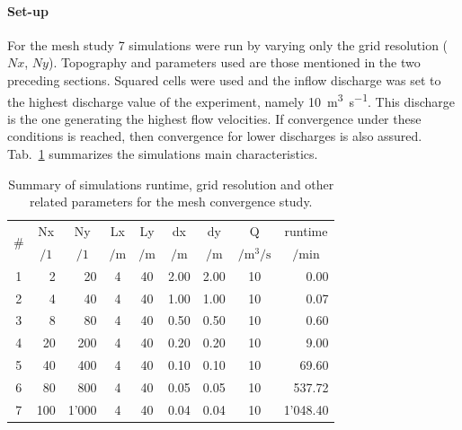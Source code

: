 \paragraph{Set-up} For the mesh study \num{7} simulations were run by varying only the grid resolution ($Nx$, $Ny$). 
Topography and parameters used are those mentioned in the two preceding sections.
Squared cells were used and the inflow discharge was set to the highest discharge value of the experiment, namely \SI{10}{\cubic\meter\per\second}.
This discharge is the one generating the highest flow velocities.
If convergence under these conditions is reached, then convergence for lower discharges is also assured.
Tab.~\ref{tab:mesh_study} summarizes the simulations main characteristics.

\begin{table}[h]
  \centering
  \caption{Summary of simulations runtime, grid resolution and other related parameters for the mesh convergence study.}
  \label{tab:mesh_study}
  \begin{tabular}{crrcccccr}
    \toprule
    \multirow{2}{*}{\#} & \multicolumn{1}{c}{Nx} & \multicolumn{1}{c}{Ny} & \multicolumn{1}{c}{Lx} & \multicolumn{1}{c}{Ly} & \multicolumn{1}{c}{dx} & \multicolumn{1}{c}{dy} & \multicolumn{1}{c}{Q} & \multicolumn{1}{c}{runtime} \\
       & \multicolumn{1}{c}{$/1$} & \multicolumn{1}{c}{$/1$} & \multicolumn{1}{c}{$/\si{\meter}$} & \multicolumn{1}{c}{$/\si{\m}$} & \multicolumn{1}{c}{$/\si{\m}$} & \multicolumn{1}{c}{$/\si{\m}$} & \multicolumn{1}{c}{$/\si{\cubic\m\per\s}$} & \multicolumn{1}{c}{$/\si{\minute}$} \\ 
    \midrule
    1  & 2             & 20            & 4               & 40          & 2.00        & 2.00        & 10                      & 0.00 \\
    2  & 4             & 40            & 4               & 40          & 1.00        & 1.00        & 10                      & 0.07 \\
    3  & 8             & 80            & 4               & 40          & 0.50        & 0.50        & 10                      & 0.60 \\
    4  & 20            & 200           & 4               & 40          & 0.20        & 0.20        & 10                      & 9.00 \\
    5  & 40            & 400           & 4               & 40          & 0.10        & 0.10        & 10                      & 69.60 \\
    6  & 80            & 800           & 4               & 40          & 0.05        & 0.05        & 10                      & 537.72 \\
    7  & 100           & 1'000         & 4               & 40          & 0.04        & 0.04        & 10                      & 1'048.40 \\
    \bottomrule
  \end{tabular}
\end{table} 

